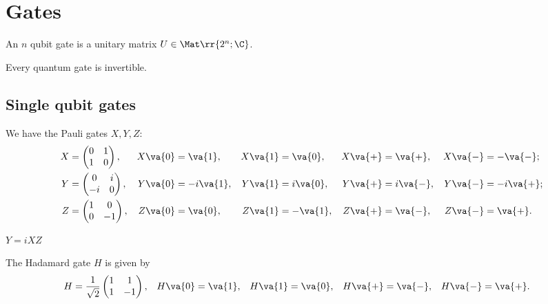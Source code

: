 \documentclass{article}
\begin{document}
\section{Gates}
\label{sec:gates}

\begin{definition}
  \label{def:single-qubit-gates}
  An $n$ qubit gate is a unitary matrix $U\in\Mat\rr{2^n;\C}$.
\end{definition}

\begin{corollary}
  Every quantum gate is invertible.
\end{corollary}

\subsection{Single qubit gates}
\label{sec:single-qubit-gates}

\begin{definition}
  We have the Pauli gates $X,Y,Z$:
  \begin{align*}
    X &=
    \begin{pmatrix}
      0 & 1 \\ 1 & 0
    \end{pmatrix},
      &X\va{0} &= \va{1},
      &X\va{1}&=\va{0},
      &X\va{+}&=\va{+},
      &X\va{-}&=-\va{-};\\
    Y &=
    \begin{pmatrix}
      0 & i \\
      -i & 0
    \end{pmatrix},
      &Y\va{0} &= -i\va{1},
      &Y\va{1} &= i\va{0},
      &Y\va{+} &= i\va{-},
      &Y\va{-} &=-i\va{+};\\
    Z &= \begin{pmatrix} 1 & 0 \\ 0 & -1 \end{pmatrix},
      &Z\va{0} &= \va{0},
      &Z\va{1} &= -\va{1},
      &Z\va{+} &= \va{-},
      &Z\va{-} &= \va{+}.
  \end{align*}
\end{definition}

\begin{lemma}
  $Y = iXZ$
\end{lemma}

\begin{definition}
  \label{def:hadamard}
  The Hadamard gate $H$ is given by
  \begin{align*}
    H &= \frac{1}{\sqrt{2}} \begin{pmatrix} 1 & 1 \\ 1 & -1 \end{pmatrix},
      & H\va{0} &=\va{1},
      & H\va{1} &=\va{0},
      & H\va{+} &=\va{-},
      & H\va{-} &=\va{+}.
  \end{align*}
\end{definition}
\end{document}
